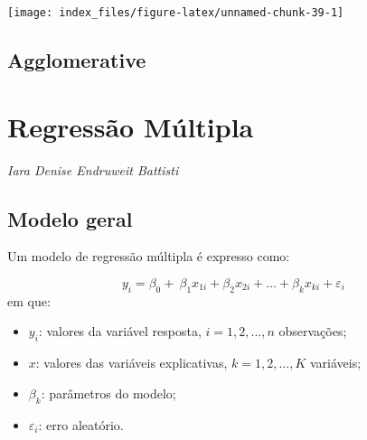 \documentclass[12pt,brazil,oneside]{book}
\newenvironment{Shaded}{\begin{snugshade}}{\end{snugshade}}
\newcommand{\CommentTok}[1]{\textcolor[rgb]{0.56,0.35,0.01}{\textit{#1}}}
\newcommand{\DataTypeTok}[1]{\textcolor[rgb]{0.13,0.29,0.53}{#1}}
\newcommand{\KeywordTok}[1]{\textcolor[rgb]{0.13,0.29,0.53}{\textbf{#1}}}
\newcommand{\NormalTok}[1]{#1}
\newcommand{\OtherTok}[1]{\textcolor[rgb]{0.56,0.35,0.01}{#1}}
\newcommand{\StringTok}[1]{\textcolor[rgb]{0.31,0.60,0.02}{#1}}
\begin{document}
\begin{Shaded}
\end{Shaded}

\begin{center}\texttt{[image: index\_files/figure-latex/unnamed-chunk-39-1]} \end{center}

\hypertarget{agglomerative}{%
\section{Agglomerative}\label{agglomerative}}

\hypertarget{regressao-multipla}{%
\chapter{Regressão Múltipla}\label{regressao-multipla}}

\emph{Iara Denise Endruweit Battisti}

\hypertarget{modelo-geral}{%
\section{Modelo geral}\label{modelo-geral}}

Um modelo de regressão múltipla é expresso como:

\[ 
y_{i} = \beta_0+\ \beta_1x_{1i}+\beta_2x_{2i}+\dots+\beta_kx_{ki}+\varepsilon_i\ 
\]
\noindent
em que:

\begin{itemize}
\item
  \(y_{i}\): valores da variável resposta, \(i = 1, 2,..., n\) observações;
\item
  \(x\): valores das variáveis explicativas, \(k = 1, 2,..., K\) variáveis;
\item
  \(\beta_k\): parâmetros do modelo;
\item
  \(\varepsilon_i\): erro aleatório.
\end{itemize}
\end{document}
